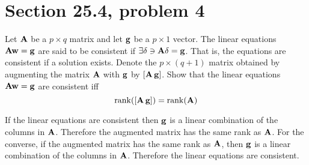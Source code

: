 \section{Section 25.4, problem 4}
Let $\bf A$ be a $p\times q$ matrix and let $\bf g$ be a $p\times 1$
vector.
The linear equations ${\bf Aw}=\bf g$ are said to be consistent if
$\exists{\bf\delta}\ni{\bf A\delta}=\bf g$.
That is, the equations are consistent if a solution exists.
Denote the $p\times(q+1)$ matrix obtained by augmenting the matrix
$\bf A$ with $\bf g$ by $[{\bf A\, g}]$.
Show that the linear equations ${\bf Aw}=\bf g$ are consistent
iff
$$\mathop{\rm rank}([{\bf A\,g}])=\mathop{\rm rank}({\bf A})$$

\bigskip
\noindent
If the linear equations are consistent then $\bf g$ is
a linear combination of the columns in $\bf A$.
Therefore the augmented matrix has
the same rank as $\bf A$.
For the converse, if the augmented matrix has the same rank as
$\bf A$, then $\bf g$ is a linear combination of the columns in
$\bf A$. Therefore the linear equations are consistent.
